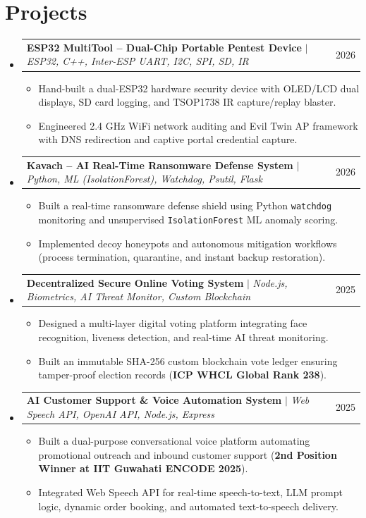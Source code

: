 \documentclass[letterpaper,11pt]{article}
\makeatletter
\newcommand{\resumeItem}[1]{
  \item\small{
    {#1 \vspace{-2pt}}
  }
}
\newcommand{\resumeProjectHeading}[2]{
    \item
    \begin{tabular*}{\textwidth}{l@{\extracolsep{\fill}}r}
      \small#1 & #2 \\
    \end{tabular*}\vspace{-7pt}
}
\newenvironment{itemList}{\begin{itemize}[leftmargin=0.15in, label={}]}{\end{itemize}}
\makeatother
\begin{document}
\section{Projects}
    \begin{itemList}

      \resumeProjectHeading
          {\textbf{ESP32 MultiTool -- Dual-Chip Portable Pentest Device} $|$ \emph{ESP32, C++, Inter-ESP UART, I2C, SPI, SD, IR}}{2026}
          \begin{itemize}
            \resumeItem{Hand-built a dual-ESP32 hardware security device with OLED/LCD dual displays, SD card logging, and TSOP1738 IR capture/replay blaster.}
            \resumeItem{Engineered 2.4 GHz WiFi network auditing and Evil Twin AP framework with DNS redirection and captive portal credential capture.}
          \end{itemize}

      \resumeProjectHeading
          {\textbf{Kavach -- AI Real-Time Ransomware Defense System} $|$ \emph{Python, ML (IsolationForest), Watchdog, Psutil, Flask}}{2026}
          \begin{itemize}
            \resumeItem{Built a real-time ransomware defense shield using Python \texttt{watchdog} monitoring and unsupervised \texttt{IsolationForest} ML anomaly scoring.}
            \resumeItem{Implemented decoy honeypots and autonomous mitigation workflows (process termination, quarantine, and instant backup restoration).}
          \end{itemize}

      \resumeProjectHeading
          {\textbf{Decentralized Secure Online Voting System} $|$ \emph{Node.js, Biometrics, AI Threat Monitor, Custom Blockchain}}{2025}
          \begin{itemize}
            \resumeItem{Designed a multi-layer digital voting platform integrating face recognition, liveness detection, and real-time AI threat monitoring.}
            \resumeItem{Built an immutable SHA-256 custom blockchain vote ledger ensuring tamper-proof election records (\textbf{ICP WHCL Global Rank 238}).}
          \end{itemize}

      \resumeProjectHeading
          {\textbf{AI Customer Support \& Voice Automation System} $|$ \emph{Web Speech API, OpenAI API, Node.js, Express}}{2025}
          \begin{itemize}
            \resumeItem{Built a dual-purpose conversational voice platform automating promotional outreach and inbound customer support (\textbf{2nd Position Winner at IIT Guwahati ENCODE 2025}).}
            \resumeItem{Integrated Web Speech API for real-time speech-to-text, LLM prompt logic, dynamic order booking, and automated text-to-speech delivery.}
          \end{itemize}


\end{itemList}
\end{document}
